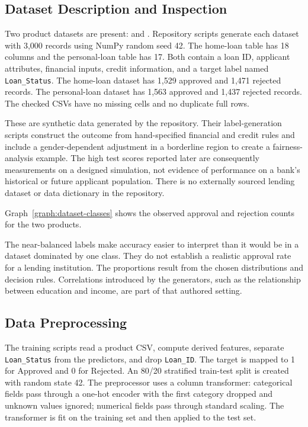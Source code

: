 \subsection{Dataset Description and Inspection}
Two product datasets are present:  and . Repository scripts generate each dataset with 3,000 records using NumPy random seed 42. The home-loan table has 18 columns and the personal-loan table has 17. Both contain a loan ID, applicant attributes, financial inputs, credit information, and a target label named \texttt{Loan\_Status}. The home-loan dataset has 1,529 approved and 1,471 rejected records. The personal-loan dataset has 1,563 approved and 1,437 rejected records. The checked CSVs have no missing cells and no duplicate full rows.

These are synthetic data generated by the repository. Their label-generation scripts construct the outcome from hand-specified financial and credit rules and include a gender-dependent adjustment in a borderline region to create a fairness-analysis example. The high test scores reported later are consequently measurements on a designed simulation, not evidence of performance on a bank's historical or future applicant population. There is no externally sourced lending dataset or data dictionary in the repository.

Graph~\ref{graph:dataset-classes} shows the observed approval and rejection counts for the two products.

The near-balanced labels make accuracy easier to interpret than it would be in a dataset dominated by one class. They do not establish a realistic approval rate for a lending institution. The proportions result from the chosen distributions and decision rules. Correlations introduced by the generators, such as the relationship between education and income, are part of that authored setting.


\subsection{Data Preprocessing}
The training scripts read a product CSV, compute derived features, separate \texttt{Loan\_Status} from the predictors, and drop \texttt{Loan\_ID}. The target is mapped to 1 for Approved and 0 for Rejected. An 80/20 stratified train-test split is created with random state 42. The preprocessor uses a column transformer: categorical fields pass through a one-hot encoder with the first category dropped and unknown values ignored; numerical fields pass through standard scaling. The transformer is fit on the training set and then applied to the test set.

